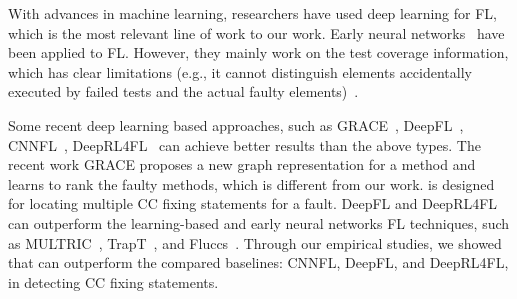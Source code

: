 With advances in machine learning, researchers have used deep learning
for FL, which is the most relevant line of work to our work. Early
neural networks~\cite{zheng2016fault, briand2007using, zhang2017deep,
  wong2009bp} have been applied to FL.  However, they mainly work on
the test coverage information, which has clear limitations (e.g., it
cannot distinguish elements accidentally executed by failed tests and
the actual faulty elements)~\cite{TraPT}.

Some recent deep learning based approaches, such as
GRACE~\cite{lou2021boosting}, DeepFL~\cite{DeepFL},
CNNFL~\cite{zhang2019cnn}, DeepRL4FL~\cite{icse21-fl} can achieve
better results than the above types. The recent work GRACE proposes a
new graph representation for a method and learns to rank the faulty
methods, which is different from our work. {\tool} is designed for
locating multiple CC fixing statements for a fault. DeepFL and
DeepRL4FL can outperform the learning-based and early neural networks
FL techniques, such as MULTRIC~\cite{MULTRIC}, TrapT~\cite{TraPT}, and
Fluccs~\cite{sohn2017fluccs}. Through our empirical studies, we showed
that {\tool} can outperform the compared baselines: CNNFL, DeepFL, and
DeepRL4FL, in detecting CC fixing statements.














\iffalse

